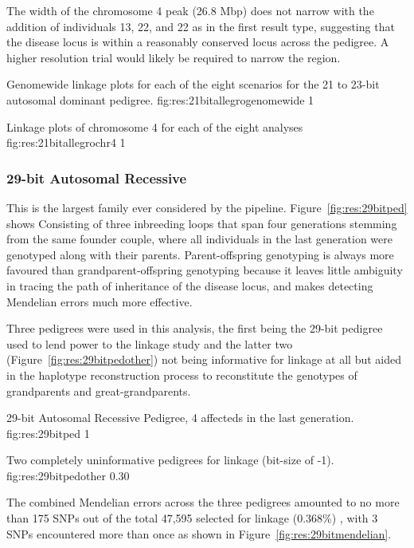 The width of the chromosome 4 peak (26.8 Mbp) does not narrow with the addition of individuals 13, 22, and 22 as in the first result type, suggesting that the disease locus is within a reasonably conserved locus across the pedigree. A higher resolution trial would likely be required to narrow the region.

	{Genomewide linkage plots for each of the eight scenarios for the 21 to 23-bit autosomal dominant pedigree.}
	{fig:res:21bitallegrogenomewide}
	{1}
	
	
	{Linkage plots of chromosome 4 for each of the eight analyses}
	{fig:res:21bitallegrochr4}
	{1}


\subsubsection{29-bit Autosomal Recessive}
This is the largest family ever considered by the pipeline. Figure~\ref{fig:res:29bitped}  shows  Consisting of three inbreeding loops  that span four generations stemming from the same founder couple, where all individuals in the last generation were genotyped along with their parents. Parent-offspring genotyping is always more favoured than grandparent-offspring genotyping because it leaves little ambiguity in tracing the path of inheritance of the disease locus, and makes detecting Mendelian errors much more effective. 

Three pedigrees were used in this analysis, the first being the 29-bit pedigree used to lend power to the linkage study and the latter two (Figure~\ref{fig:res:29bitpedother}) not being informative for linkage at all but aided in the haplotype reconstruction process to reconstitute the genotypes of grandparents and great-grandparents.

	{29-bit Autosomal Recessive Pedigree, 4 affecteds in the last generation.}
	{fig:res:29bitped}
	{1}

	{Two completely uninformative pedigrees for linkage (bit-size of -1).}
	{fig:res:29bitpedother}
	{0.30}

The combined Mendelian errors across the three pedigrees amounted to no more than 175 SNPs out of the total 47,595 selected for linkage (0.368\%) , with 3 SNPs encountered more than once as shown in Figure~\ref{fig:res:29bitmendelian}.

